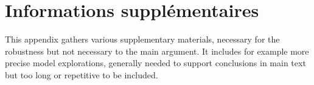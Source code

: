 


\chapter{Informations supplémentaires}

\label{app:supplementary} %




This appendix gathers various supplementary materials, necessary for the robustness but not necessary to the main argument. It includes for example more precise model explorations, generally needed to support conclusions in main text but too long or repetitive to be included.

















